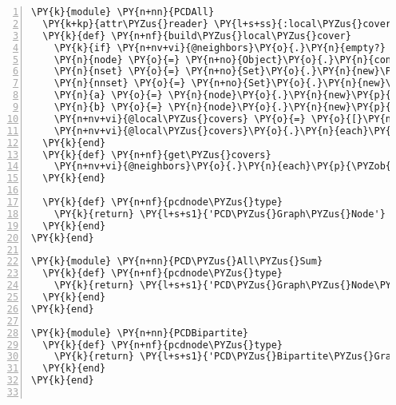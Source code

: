 \begin{Verbatim}[commandchars=\\\{\},numbers=left,firstnumber=1,stepnumber=1,xleftmargin=7mm, fontsize=\small]
\PY{k}{module} \PY{n+nn}{PCDAll}
  \PY{k+kp}{attr\PYZus{}reader} \PY{l+s+ss}{:local\PYZus{}covers}
  \PY{k}{def} \PY{n+nf}{build\PYZus{}local\PYZus{}cover}
    \PY{k}{if} \PY{n+nv+vi}{@neighbors}\PY{o}{.}\PY{n}{empty?} \PY{k}{then} \PY{k}{return} \PY{l+s+ss}{:empty} \PY{k}{end}
    \PY{n}{node} \PY{o}{=} \PY{n+no}{Object}\PY{o}{.}\PY{n}{const\PYZus{}get}\PY{p}{(}\PY{n}{pcdnode\PYZus{}type}\PY{p}{)}
    \PY{n}{nset} \PY{o}{=} \PY{n+no}{Set}\PY{o}{.}\PY{n}{new}\PY{p}{(}\PY{n+nv+vi}{@neighbors}\PY{p}{)}
    \PY{n}{nnset} \PY{o}{=} \PY{n+no}{Set}\PY{o}{.}\PY{n}{new}\PY{p}{(}\PY{n+nv+vi}{@neighbors}\PY{o}{.}\PY{n}{collect}\PY{p}{\PYZob{}}\PY{o}{|}\PY{n}{k}\PY{o}{|} \PY{n}{k}\PY{o}{.}\PY{n}{neighbors}\PY{p}{\PYZcb{}}\PY{o}{.}\PY{n}{flatten}\PY{p}{)}\PY{o}{-}\PY{n}{nset}
    \PY{n}{a} \PY{o}{=} \PY{n}{node}\PY{o}{.}\PY{n}{new}\PY{p}{(}\PY{n}{nset}\PY{o}{.}\PY{n}{to\PYZus{}a}\PY{p}{)}
    \PY{n}{b} \PY{o}{=} \PY{n}{node}\PY{o}{.}\PY{n}{new}\PY{p}{(}\PY{n}{nnset}\PY{o}{.}\PY{n}{to\PYZus{}a}\PY{p}{)}
    \PY{n+nv+vi}{@local\PYZus{}covers} \PY{o}{=} \PY{o}{[}\PY{n}{a}\PY{p}{,}\PY{n}{b}\PY{o}{]}
    \PY{n+nv+vi}{@local\PYZus{}covers}\PY{o}{.}\PY{n}{each}\PY{p}{\PYZob{}}\PY{o}{|}\PY{n}{k}\PY{o}{|} \PY{n+nv+vi}{@covers}\PY{o}{.}\PY{n}{add\PYZus{}node}\PY{p}{(}\PY{n}{k}\PY{p}{)}\PY{p}{\PYZcb{}}
  \PY{k}{end}
  \PY{k}{def} \PY{n+nf}{get\PYZus{}covers}
    \PY{n+nv+vi}{@neighbors}\PY{o}{.}\PY{n}{each}\PY{p}{\PYZob{}}\PY{o}{|}\PY{n}{k}\PY{o}{|} \PY{n}{k}\PY{o}{.}\PY{n}{local\PYZus{}covers}\PY{o}{.}\PY{n}{each}\PY{p}{\PYZob{}}\PY{o}{|}\PY{n}{j}\PY{o}{|} \PY{n+nv+vi}{@covers}\PY{o}{.}\PY{n}{add\PYZus{}node}\PY{p}{(}\PY{n}{j}\PY{p}{)}\PY{p}{\PYZcb{}}\PY{p}{\PYZcb{}}
  \PY{k}{end}

  \PY{k}{def} \PY{n+nf}{pcdnode\PYZus{}type}
    \PY{k}{return} \PY{l+s+s1}{'PCD\PYZus{}Graph\PYZus{}Node'}
  \PY{k}{end}
\PY{k}{end}

\PY{k}{module} \PY{n+nn}{PCD\PYZus{}All\PYZus{}Sum}
  \PY{k}{def} \PY{n+nf}{pcdnode\PYZus{}type}
    \PY{k}{return} \PY{l+s+s1}{'PCD\PYZus{}Graph\PYZus{}Node\PYZus{}Sum'}
  \PY{k}{end}
\PY{k}{end}

\PY{k}{module} \PY{n+nn}{PCDBipartite}
  \PY{k}{def} \PY{n+nf}{pcdnode\PYZus{}type}
    \PY{k}{return} \PY{l+s+s1}{'PCD\PYZus{}Bipartite\PYZus{}Graph\PYZus{}Node'}
  \PY{k}{end}
\PY{k}{end}


\end{Verbatim}
